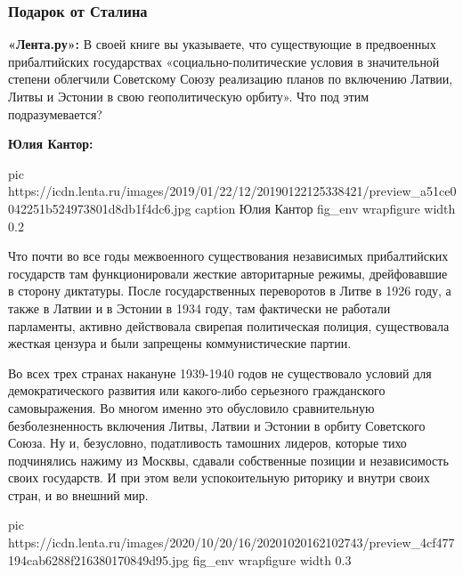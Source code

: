  
 
 
 
 

\subsubsection{Подарок от Сталина}
\label{sec:02_12_2020.news.ru.lenta_ru.mozzhuhin_andrei.1.pribaltika.podarok_ot_stalina}

\textbf{«Лента.ру»:} В своей книге вы указываете, что существующие в предвоенных
прибалтийских государствах «социально-политические условия в значительной
степени облегчили Советскому Союзу реализацию планов по включению Латвии, Литвы
и Эстонии в свою геополитическую орбиту». Что под этим подразумевается?

\textbf{Юлия Кантор:} 

\ifcmt
pic https://icdn.lenta.ru/images/2019/01/22/12/20190122125338421/preview_a51ce0042251b524973801d8db1f4dc6.jpg
caption Юлия Кантор
fig_env wrapfigure
width 0.2
\fi

Что почти во все годы межвоенного существования независимых прибалтийских
государств там функционировали жесткие авторитарные режимы, дрейфовавшие в
сторону диктатуры. После государственных переворотов в Литве в 1926 году, а
также в Латвии и в Эстонии в 1934 году, там фактически не работали парламенты,
активно действовала свирепая политическая полиция, существовала жесткая цензура
и были запрещены коммунистические партии.

Во всех трех странах накануне 1939-1940 годов не существовало условий для
демократического развития или какого-либо серьезного гражданского
самовыражения. Во многом именно это обусловило сравнительную безболезненность
включения Литвы, Латвии и Эстонии в орбиту Советского Союза. Ну и, безусловно,
податливость тамошних лидеров, которые тихо подчинялись нажиму из Москвы,
сдавали собственные позиции и независимость своих государств. И при этом вели
успокоительную риторику и внутри своих стран, и во внешний мир.

\ifcmt
pic https://icdn.lenta.ru/images/2020/10/20/16/20201020162102743/preview_4cf477194cab6288f216380170849d95.jpg
fig_env wrapfigure
width 0.3
\fi

